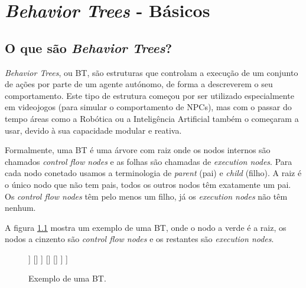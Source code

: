 
\chapter{\textit{Behavior Trees} - Básicos} %

\label{Chapter2} %



\section{O que são \textit{Behavior Trees}?}
\textit{Behavior Trees}, ou BT, são estruturas que controlam a execução de um conjunto de ações por parte de um agente autónomo, de forma a descreverem o seu comportamento.
Este tipo de estrutura começou por ser utilizado especialmente em videojogos (para simular o comportamento de NPCs), mas com o passar do tempo áreas como a Robótica ou a Inteligência Artificial também o começaram a usar, devido à sua capacidade modular e reativa.

Formalmente, uma BT é uma árvore com raiz onde os nodos internos são chamados \textit{control flow nodes} e as folhas são chamadas de \textit{execution nodes}. Para cada nodo conetado usamos a terminologia de \textit{parent} (pai) e \textit{child} (filho).
A raiz é o único nodo que não tem pais, todos os outros nodos têm exatamente um pai.
Os \textit{control flow nodes} têm pelo menos um filho, já os \textit{execution nodes} não têm nenhum.

A figura \ref{fig:2.1} mostra um exemplo de uma BT, onde o nodo a verde é a raiz, os nodos a cinzento são \textit{control flow nodes} e os restantes são \textit{execution nodes}.

\begin{figure}[H]
\centering
\begin{behavior}
    [\rootnode
        [\sequence
            [\action{Walk to door}]
            [\selector
                [\action{Open door}]
                [\sequence
                    [\action{Unlock door}]
                    [\action{Open door}]
                ]
                []
            ]
            []
            []
        ]
    ]
\end{behavior}
\caption{Exemplo de uma BT.}
\label{fig:2.1}
\end{figure}

